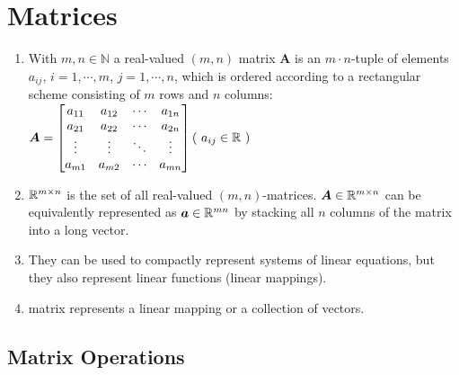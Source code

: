 \chapter{Matrices}

\begin{enumerate}
    \item With $m, n \in \mathbb{N}$ a real-valued $(m, n)$ matrix $\bm{A}$ is an $m\cdot n$-tuple of elements $a_{ij}$, $i = 1, \cdots , m$, $j = 1, \cdots , n$, which is ordered according to a rectangular scheme consisting of $m$ rows and $n$ columns:
    \\[0.2cm]
    $
        \bm{A}
        = 
        \begin{bmatrix}
            a_{11} & a_{12} & \cdots & a_{1n} \\
            a_{21} & a_{22} & \cdots & a_{2n} \\
            \vdots & \vdots & \ddots & \vdots \\
            a_{m1} & a_{m2} & \cdots & a_{mn} \\
        \end{bmatrix}
        \hfill
        (\ a_{ij} \in \mbbR \ )
    $
    \hfill \cite{mfml/book/mml/Deisenroth-Faisal-Ong}

    \item $\mathbb{R}^{m\times n}$ is the set of all real-valued $(m, n)$-matrices. $\bm{A} \in \mathbb{R}^{m\times n}$ can be equivalently represented as $\bm{a} \in \mathbb{R}^{mn}$ by stacking all $n$ columns of the matrix into a long vector.
    \hfill \cite{mfml/book/mml/Deisenroth-Faisal-Ong}

    \vspace{0.5cm}

    \item They can be used to compactly represent systems of linear equations, but they also represent linear functions (linear mappings).
    \hfill \cite{mfml/book/mml/Deisenroth-Faisal-Ong}

    \item matrix represents a linear mapping or a collection of vectors.
    \hfill \cite{mfml/book/mml/Deisenroth-Faisal-Ong}
\end{enumerate}


\section{Matrix Operations}










